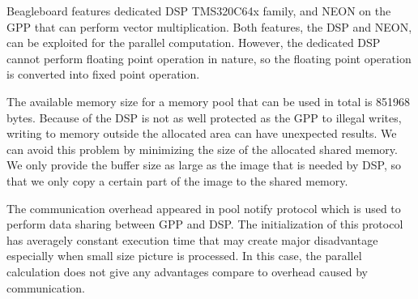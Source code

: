 \documentclass[conference]{IEEEtran}
\begin{document}
Beagleboard features dedicated DSP TMS320C64x family, and NEON on the GPP that can perform vector multiplication. Both features, the DSP and NEON, can be exploited for the parallel computation. However, the dedicated DSP cannot perform floating point operation in nature, so the floating point operation is converted into fixed point operation.

The available memory size for a memory pool that can be used in total is 851968 bytes. Because of the DSP is not as well protected as the GPP to illegal writes, writing to memory outside the allocated area can have unexpected results. We can avoid this problem by minimizing the size of the allocated shared memory. We only provide the buffer size as large as the image that is needed by DSP, so that we only copy a certain part of the image to the shared memory. 

The communication overhead appeared in pool notify protocol which is used to perform data sharing between GPP and DSP. The initialization of this protocol has averagely constant execution time that may create major disadvantage especially when small size picture is processed. In this case, the parallel calculation does not give any advantages compare to overhead caused by communication. 
\end{document}
